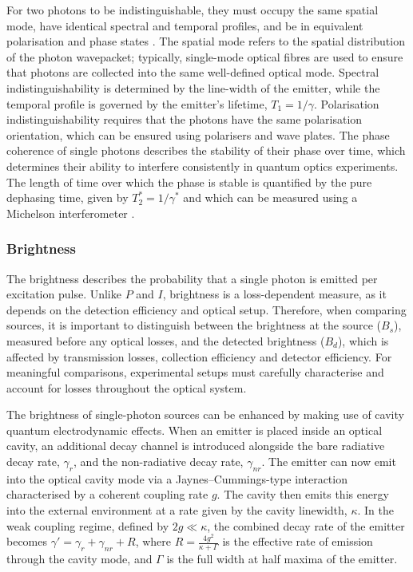 For two photons to be indistinguishable, they must occupy the same spatial mode, have identical spectral and temporal profiles, and be in equivalent polarisation and phase states \cite{Senellart2017}. The spatial mode refers to the spatial distribution of the photon wavepacket; typically, single-mode optical fibres are used to ensure that photons are collected into the same well-defined optical mode. Spectral indistinguishability is determined by the line-width of the emitter, while the temporal profile is governed by the emitter’s lifetime, $T_1=1/\gamma$. Polarisation indistinguishability requires that the photons have the same polarisation orientation, which can be ensured using polarisers and wave plates. The phase coherence of single photons describes the stability of their phase over time, which determines their ability to interfere consistently in quantum optics experiments. The length of time over which the phase is stable is quantified by the pure dephasing time, given by $T_2^*=1/\gamma^*$ and which can be measured using a Michelson interferometer \cite{Michelson1887, Jelezko2003}. 


\subsubsection{Brightness}

The brightness describes the probability that a single photon is emitted per excitation pulse. Unlike $P$ and $I$, brightness is a loss-dependent measure, as it depends on the detection efficiency and optical setup. Therefore, when comparing sources, it is important to distinguish between the brightness at the source ($B_s$), measured before any optical losses, and the detected brightness ($B_d$), which is affected by transmission losses, collection efficiency and detector efficiency. For meaningful comparisons, experimental setups must carefully characterise and account for losses throughout the optical system.

The brightness of single-photon sources can be enhanced by making use of cavity quantum electrodynamic effects. When an emitter is placed inside an optical cavity, an additional decay channel is introduced alongside the bare radiative decay rate, $\gamma_r$, and the non-radiative decay rate, $\gamma_{nr}$. The emitter can now emit into the optical cavity mode via a Jaynes–Cummings-type interaction characterised by a coherent coupling rate $g$. The cavity then emits this energy into the external environment at a rate given by the cavity linewidth, $\kappa$. In the weak coupling regime, defined by $2g \ll \kappa$, the combined decay rate of the emitter becomes $\gamma' = \gamma_r + \gamma_{nr} + R$, where $R = \frac{4g^2}{\kappa + \Gamma}$ is the effective rate of emission through the cavity mode, and $\Gamma$ is the full width at half maxima of the emitter.

